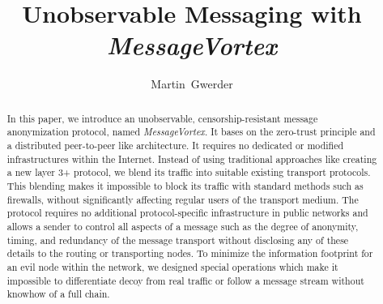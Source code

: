 \documentclass[acmsmall, screen]{acmart}
\begin{document}
\title{Unobservable Messaging with \emph{MessageVortex}}

\author{Martin~Gwerder}



\begin{abstract}
In this paper, we introduce an unobservable, censorship-resistant message anonymization protocol, named \emph{MessageVortex}. It bases on the zero-trust principle and a distributed peer-to-peer like architecture. It requires no dedicated or modified infrastructures within the Internet. Instead of using traditional approaches like creating a new layer 3+ protocol, we blend its traffic into suitable existing transport protocols. This blending makes it impossible to block its traffic with standard methods such as firewalls, without significantly affecting regular users of the transport medium. The protocol requires no additional protocol-specific infrastructure in public networks and allows a sender to control all aspects of a message such as the degree of anonymity, timing, and redundancy of the message transport without disclosing any of these details to the routing or transporting nodes. To minimize the information footprint for an evil node within the network, we designed special operations which make it impossible to differentiate decoy from real traffic or follow a message stream without knowhow of a full chain.
\end{abstract}

\maketitle
\end{document}
